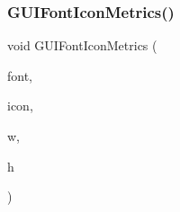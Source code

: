 \mbox{\label{wii_2gui-font_8c_a70534a7637eda192a15884d8930a61b8}} 
\subsubsection{\texorpdfstring{G\+U\+I\+Font\+Icon\+Metrics()}{GUIFontIconMetrics()}}
{\footnotesize\ttfamily void G\+U\+I\+Font\+Icon\+Metrics (\begin{DoxyParamCaption}\item[{const struct G\+U\+I\+Font $\ast$}]{font,  }\item[{enum G\+U\+I\+Icon}]{icon,  }\item[{unsigned $\ast$}]{w,  }\item[{unsigned $\ast$}]{h }\end{DoxyParamCaption})}


